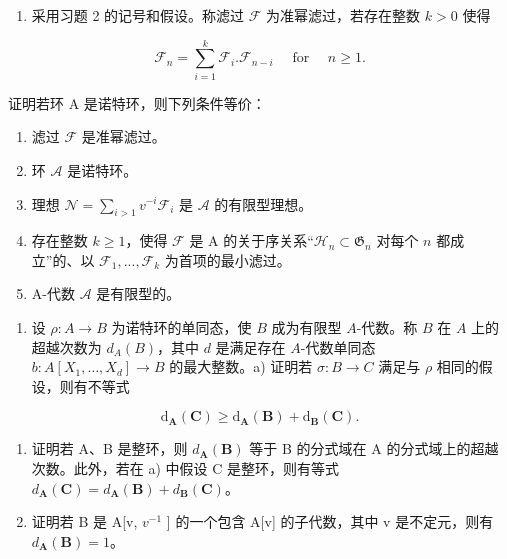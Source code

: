 \begin{enumerate}
\def\labelenumi{\arabic{enumi})}
\setcounter{enumi}{3}
\tightlist
\item
  采用习题 2 的记号和假设。称滤过 \(\mathcal{F}\) 为准幂滤过，若存在整数 \(k > 0\) 使得
\end{enumerate}

\[
\mathcal {F} _ {n} = \sum_ {i = 1} ^ {k} \mathcal {F} _ {i}. \mathcal {F} _ {n - i} \quad \text { for } \quad n \geqslant 1.
\]

证明若环 A 是诺特环，则下列条件等价：

\begin{enumerate}
\def\labelenumi{(\roman{enumi})}
\item
  滤过 \(\mathcal{F}\) 是准幂滤过。
\item
  环 \(\mathcal{A}\) 是诺特环。
\item
  理想 \(\mathcal{N} = \sum_{i > 1} v^{-i}\mathcal{F}_i\) 是 \(\mathcal{A}\) 的有限型理想。
\item
  存在整数 \(k \geqslant 1\)，使得 \(\mathcal{F}\) 是 A 的关于序关系“\(\mathcal{H}_n \subset \mathfrak{G}_n\) 对每个 \(n\) 都成立”的、以 \(\mathcal{F}_1, ..., \mathcal{F}_k\) 为首项的最小滤过。
\item
  A-代数 \(\mathcal{A}\) 是有限型的。
\end{enumerate}

\begin{enumerate}
\def\labelenumi{\arabic{enumi})}
\setcounter{enumi}{4}
\tightlist
\item
  设 \(\rho: A \to B\) 为诺特环的单同态，使 \(B\) 成为有限型 \(A\)-代数。称 \(B\) 在 \(A\) 上的超越次数为 \(d_A(B)\)，其中 \(d\) 是满足存在 \(A\)-代数单同态 \(b: A[X_1, \ldots, X_d] \to B\) 的最大整数。a) 证明若 \(\sigma: B \to C\) 满足与 \(\rho\) 相同的假设，则有不等式
\end{enumerate}

\[
\mathrm{d} _ {\mathbf {A}} (\mathbf {C}) \geqslant \mathrm{d} _ {\mathbf {A}} (\mathbf {B}) + \mathrm{d} _ {\mathbf {B}} (\mathbf {C}).
\]

\begin{enumerate}
\def\labelenumi{\alph{enumi})}
\setcounter{enumi}{1}
\item
  证明若 A、B 是整环，则 \(d_{\mathbf{A}}(\mathbf{B})\) 等于 B 的分式域在 A 的分式域上的超越次数。此外，若在 a) 中假设 C 是整环，则有等式 \(d_{\mathbf{A}}(\mathbf{C}) = d_{\mathbf{A}}(\mathbf{B}) + d_{\mathbf{B}}(\mathbf{C})\)。
\item
  证明若 B 是 A{[}v, \(v^{-1}\) {]} 的一个包含 A{[}v{]} 的子代数，其中 v 是不定元，则有 \(d_{\mathbf{A}}(\mathbf{B}) = 1\)。
\end{enumerate}

